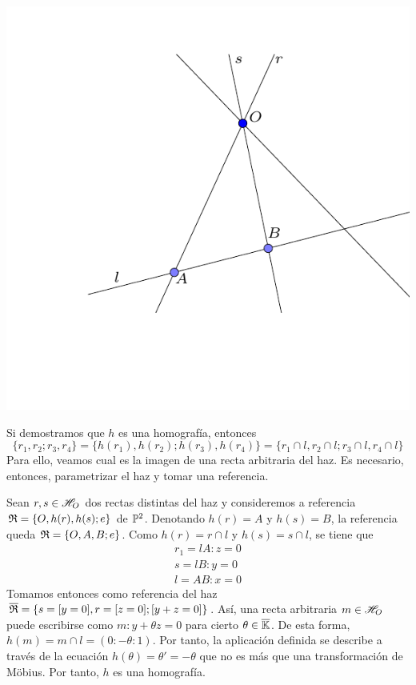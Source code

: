 \begin{center}
	\includegraphics[scale=.8]{Graficos/RazonDoble/rectas_dual}
\end{center}
Si demostramos que $h$ es una homografía, entonces
\begin{equation}
 \{r_1,r_2;r_3,r_4\}=\{h(r_1),h(r_2);h(r_3),h(r_4)\}=\{r_1\cap l,r_2\cap l;r_3\cap l,r_4\cap l\}
\end{equation}
Para ello, veamos cual es la imagen de una recta arbitraria del haz. Es necesario, entonces, parametrizar el haz y tomar una referencia.

Sean $r,s\in\mathscr{H}_O$ dos rectas distintas del haz y consideremos a referencia $\mathfrak{R}=\{O,h(r),h(s);e\}$ de $\mathbb{P}^2$. Denotando $h(r)=A$ y $h(s)=B$, la referencia queda $\mathfrak{R}=\{O,A,B;e\}$. Como $h(r)=r\cap l $ y $h(s)=s\cap l$, se tiene que
\[\begin{array}{c}
r_1=lA:z=0\\
s=lB:y=0\\
l=AB:x=0
\end{array}\]
Tomamos entonces como referencia del haz $\mathfrak{\overline{R}}=\{s=[y=0],r=[z=0];[y+z=0]\}$. Así, una recta arbitraria $m\in\mathscr{H}_O$ puede escribirse como $m:y+\theta z=0$ para cierto $\theta\in\overline{\mathbb{K}}$. De esta forma, $h(m)=m\cap l=(0:-\theta:1)$. Por tanto, la aplicación definida se describe a través de la ecuación $h(\theta)=\theta'=-\theta$ que no es más que una transformación de Möbius. Por tanto, $h$ es una homografía.

